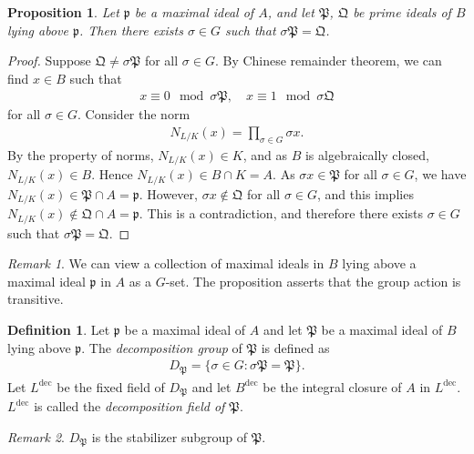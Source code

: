 \documentclass[12pt]{article}
\theoremstyle{plain}
\newtheorem{proposition}[theorem]{Proposition}
\theoremstyle{remark}
\newtheorem*{remark}{Remark}
\theoremstyle{definition}
\newtheorem{definition}[theorem]{Definition}
\begin{document}
\begin{proposition}
    Let $\mathfrak{p}$ be a maximal ideal of $A$, and let $\mathfrak{P}$, $\mathfrak{Q}$ be prime ideals of $B$ lying above $\mathfrak{p}$. Then there exists $\sigma\in G$ such that $\sigma\mathfrak{P}=\mathfrak{Q}$.
\end{proposition}
\begin{proof}
    Suppose $\mathfrak{Q}\neq \sigma\mathfrak{P}$ for all $\sigma\in G$. By Chinese remainder theorem, we can find $x\in B$ such that
    \begin{align*}
        x\equiv 0\mod \sigma\mathfrak{P},\quad x\equiv 1\mod \sigma\mathfrak{Q}
    \end{align*}
    for all $\sigma\in G$. Consider the norm
    \begin{align*}
        N_{L/K}(x) = \prod_{\sigma\in G}\sigma x.
    \end{align*}
    By the property of norms, $N_{L/K}(x)\in K$, and as $B$ is algebraically closed, $N_{L/K}(x)\in B$. Hence $N_{L/K}(x)\in B\cap K=A$. As $\sigma x\in \mathfrak{P}$ for all $\sigma\in G$, we have $N_{L/K}(x)\in \mathfrak{P}\cap A = \mathfrak{p}$. However, $\sigma x\not\in \mathfrak{Q}$ for all $\sigma\in G$, and this implies $N_{L/K}(x)\notin \mathfrak{Q}\cap A = \mathfrak{p}$. This is a contradiction, and therefore there exists $\sigma\in G$ such that $\sigma\mathfrak{P}=\mathfrak{Q}$. 
\end{proof}
\begin{remark}
    We can view a collection of maximal ideals in $B$ lying above a maximal ideal $\mathfrak{p}$ in $A$ as a $G$-set. The proposition asserts that the group action is transitive.
\end{remark}

\begin{definition}
    Let $\mathfrak{p}$ be a maximal ideal of $A$ and let $\mathfrak{P}$ be a maximal ideal of $B$ lying above $\mathfrak{p}$. The \emph{decomposition group} of $\mathfrak{P}$ is defined as
    \begin{align*}
        D_\mathfrak{P}=\{\sigma\in G:\sigma\mathfrak{P}=\mathfrak{P}\}.
    \end{align*}
    Let $L^\mathrm{dec}$ be the fixed field of $D_\mathfrak{P}$ and let $B^\mathrm{dec}$ be the integral closure of $A$ in $L^\mathrm{dec}$. $L^\mathrm{dec}$ is called the \emph{decomposition field of $\mathfrak{P}$}.
    \begin{figure}[H]
        \centering
    \end{figure}
\end{definition}
\begin{remark}
    $D_\mathfrak{P}$ is the stabilizer subgroup of $\mathfrak{P}$.
\end{remark}
\end{document}
